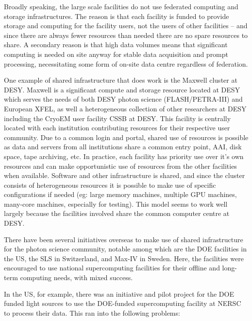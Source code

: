Broadly speaking, the large scale facilities do not use federated
computing and storage infrastructures.  The reason is that each facility
is funded to provide storage and computing for the facility users, not
the users of other facilities – and since there are always fewer
resources than needed there are no spare resources to share.  A
secondary reason is that high data volumes means that significant
computing is needed on site anyway for stable data acquisition and
prompt processing, necessitating some form of on-site data centre
regardless of federation. 

One example of shared infrastructure that does work is the Maxwell
cluster at DESY.  Maxwell is a significant compute and storage resource
located at DESY which serves the needs of both DESY photon science
(FLASH/PETRA-III) and European XFEL, as well a heterogeneous collection
of other researchers at DESY including the CryoEM user facility CSSB at
DESY.   This facility is centrally located with each institution
contributing resources for their respective user community.  Due to a
common login and portal, shared use of resources is possible as data and
servers from all institutions share a common entry point, AAI, disk
space, tape archiving, etc.  In practice, each facility has priority use
over it’s own resources and can make opportunistic use of resources from
the other facilities when available.  Software and other infrastructure
is shared, and since the cluster consists of heterogeneous resources it
is possible to make use of specific configurations if needed (eg: large
memory machines, multiple GPU machines, many-core machines, especially
for testing). This model seems to work well largely because the
facilities involved share the common computer centre at DESY. 

There have been several initiatives overseas to make use of shared
infrastructure for the photon science community, notable among which are
the DOE facilities in the US, the SLS in Switzerland, and Max-IV in
Sweden.  Here, the facilities were encouraged to use national
supercomputing facilities for their offline and long-term computing
needs, with mixed success.  

In the US, for example, there was an initiative and pilot project for
the DOE funded light sources to use the DOE-funded supercomputing
facility at NERSC to process their data.  This ran into the following
problems:

